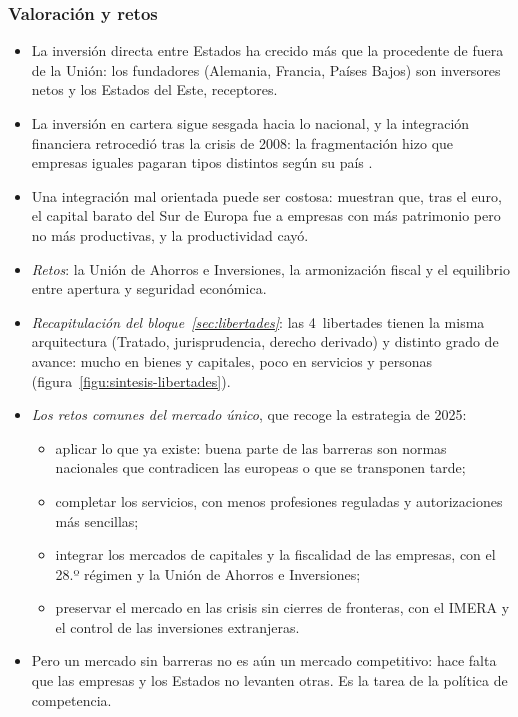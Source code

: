 \documentclass[11pt]{article}
\begin{document}
\subsubsection{Valoración y retos}\label{sec:capitales-valoracion}

\begin{itemize}
\item[(+)] La inversión directa entre Estados ha crecido más que la procedente de fuera de la Unión: los fundadores (Alemania, Francia, Países Bajos) son inversores netos y los Estados del Este, receptores.
\item[(--)] La inversión en cartera sigue sesgada hacia lo nacional, y la integración financiera retrocedió tras la crisis de 2008: la fragmentación hizo que empresas iguales pagaran tipos distintos según su país .
\item[(--)] Una integración mal orientada puede ser costosa: \textcite{GopinathEtAl2017Capital} muestran que, tras el euro, el capital barato del Sur de Europa fue a empresas con más patrimonio pero no más productivas, y la productividad cayó.
\item \emph{Retos}: la Unión de Ahorros e Inversiones, la armonización fiscal y el equilibrio entre apertura y seguridad económica.
\end{itemize}

\begin{itemize}
\item \emph{Recapitulación del bloque~\ref{sec:libertades}}: las 4~libertades tienen la misma arquitectura (Tratado, jurisprudencia, derecho derivado) y distinto grado de avance: mucho en bienes y capitales, poco en servicios y personas (figura~\ref{figu:sintesis-libertades}).
\item \emph{Los retos comunes del mercado único}, que recoge la estrategia de 2025:
  \begin{itemize}
  \item aplicar lo que ya existe: buena parte de las barreras son normas nacionales que contradicen las europeas o que se transponen tarde;
  \item completar los servicios, con menos profesiones reguladas y autorizaciones más sencillas;
  \item integrar los mercados de capitales y la fiscalidad de las empresas, con el 28.º régimen y la Unión de Ahorros e Inversiones;
  \item preservar el mercado en las crisis sin cierres de fronteras, con el IMERA y el control de las inversiones extranjeras.
  \end{itemize}
\item Pero un mercado sin barreras no es aún un mercado competitivo: hace falta que las empresas y los Estados no levanten otras. Es la tarea de la política de competencia.
\end{itemize}
\end{document}

